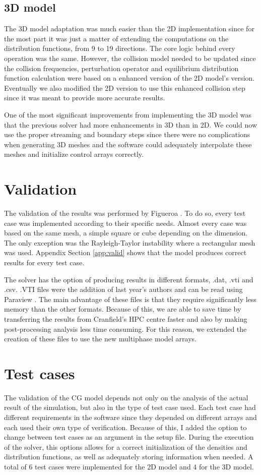 \documentclass[12pt, openany]{book}
\begin{document}
\subsection{3D model}
The 3D model adaptation was much easier than the 2D implementation since for the most part it was just a matter of extending the computations on the distribution functions, from 9 to 19 directions. The core logic behind every operation was the same. However, the collision model needed to be updated since the collision frequencies, perturbation operator and equilibrium distribution function calculation were based on a enhanced version of the 2D model's version. Eventually we also modified the 2D version to use this enhanced collision step since it was meant to provide more accurate results. \par
One of the most significant improvements from implementing the 3D model was that the previous solver had more enhancements in 3D than in 2D. We could now use the proper streaming and boundary steps since there were no complications when generating 3D meshes and the software could adequately interpolate these meshes and initialize control arrays correctly. 

\section{Validation}
The validation of the results was performed by Figueroa \cite{antonioThesis}. To do so, every test case was implemented according to their specific needs. Almost every case was based on the same mesh, a simple square or cube depending on the dimension. The only exception was the Rayleigh-Taylor instability where a rectangular mesh was used. Appendix Section \ref{app:valid} shows that the model produces correct results for every test case. \par
The solver has the option of producing results in different formats, .dat, .vti and .csv. .VTI files were the addition of last year's authors and can be read using Paraview \cite{paraview}. The main advantage of these files is that they require significantly less memory than the other formats. Because of this, we are able to save time by transferring the results from Cranfield's HPC centre faster and also by making post-processing analysis less time consuming. For this reason, we extended the creation of these files to use the new multiphase model arrays.
\section{Test cases}\label{sec:testcases}
The validation of the CG model depends not only on the analysis of the actual result of the simulation, but also in the type of test case used. Each test case had different requirements in the software since they depended on different arrays and each used their own type of verification. Because of this, I added the option to change between test cases as an argument in the setup file. During the execution of the solver, this options allows for a correct initialization of the densities and distribution functions, as well as adequately storing information when needed.
A total of 6 test cases were implemented for the 2D model and 4 for the 3D model.
\end{document}
